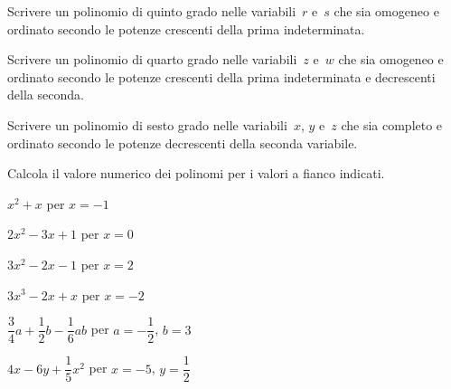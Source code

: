 \begin{multicols}{2}
\begin{esercizio}
\label{ese:10.8}
Scrivere un polinomio di quinto grado nelle variabili~$r$ e~$s$ che sia omogeneo 
e ordinato secondo le
potenze crescenti della prima indeterminata.
\end{esercizio}

\begin{esercizio}
\label{ese:10.9}
Scrivere un polinomio di quarto grado nelle variabili~$z$ e~$w$ che sia omogeneo 
e ordinato secondo le
potenze crescenti della prima indeterminata e decrescenti della seconda.
\end{esercizio}

\begin{esercizio}
\label{ese:10.10}
Scrivere un polinomio di sesto grado nelle variabili~$x$, $y$ e~$z$ che sia 
completo e ordinato secondo le
potenze decrescenti della seconda variabile.
\end{esercizio}

\begin{esercizio}
\label{ese:10.11}
Calcola il valore numerico dei polinomi per i valori a fianco indicati.

\begin{enumeratea}
\item $x^2+x$ per $x=-1$
\item $2x^2-3x+1$ per $x=0$
\item $3x^2-2x-1$ per $x=2$
\item $3x^3-2x+x$ per $x=-2$
\item $\dfrac{3}{4}a+\dfrac{1}{2}b-\dfrac{1}{6}ab$ per $a=-\dfrac{1}{2}$, $b=3$
\item $4x-6y+\dfrac{1}{5}x^2$ per $x=-5$, $y=\dfrac{1}{2}$
\end{enumeratea}
\end{esercizio}
\end{multicols}

\subsubsection*{}

